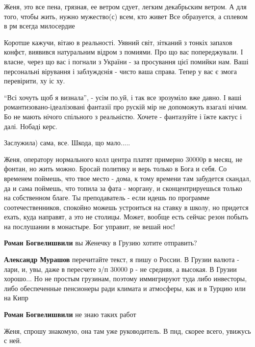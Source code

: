\begin{itemize}

Женя, это все пена, грязная, ее ветром сдует, легким декабрьским ветром.
А для того, чтобы жить, нужно мужество(с) всем, кто живет
Все образуется, а сплевом в рм всегда милосердие


Коротше кажучи, вітаю в реальності. Уявний світ, зітканий з тонкіх запахов
конфєт, виявився натуральним відром з помиями. Про що вас попереджували. І
власне, через що вас і погнали з України - за просування цієї помийки нам. Ваші
персональні вірування і заблуждєнія - чисто ваша справа. Тепер у вас є змога
перевірити, ху іс ху.

\enquote{Всі хочуть щоб я визнала}, - усім по.уй, і так все зрозуміло вже давно. І ваші
романтизовано-ідеалізовані фантазії про рускій мір не допоможуть взагалі нічим.
Бо не мають нічого спільного з реальністю. Хочете - фантазуйте і їжте кактус і
далі. Нобаді керс.

Заслужила) сама, все. Шкода, що мало.....


Женя, оператору нормального колл центра платят примерно 30000р в месяц, не
фонтан, но жить можно. Бросай политику и верь только в Бога и себя. Со временем
поймешь, что твое место - дома, к тому времени там забудется скандал, да и сама
поймешь, что топила за фата - моргану, и сконцентрируешься только на
собственном благе. Ты преподаватель - если идешь по программе
соотечественников, спокойно можешь устроиться на ставку в школу, но придется
ехать, куда направят, а это не столицы. Может, вообще есть сейчас резон побыть
на послушании в монастыре. Бог управит, не вешай нос!

\begin{itemize} %
\textbf{Роман Богвелишвили} вы Женечку в Грузию хотите отправить?

\textbf{Александр Мурашов} перечитайте текст, я пишу о России. В Грузии валюта - лари, и, увы, даже в пересчете з/п 30000 р - не средняя, а высокая. В Грузии хорошо... Но не простым грузинам, поэтому иммигрируют туда либо инвесторы, либо обеспеченные пенсионеры ради климата и атмосферы, как и в Турцию или на Кипр

\textbf{Роман Богвелишвили} не знаю таких работ

Женя, спрошу знакомую, она там уже руководитель. В пнд, скорее всего, увижусь с ней.
\end{itemize} %


\end{itemize}

